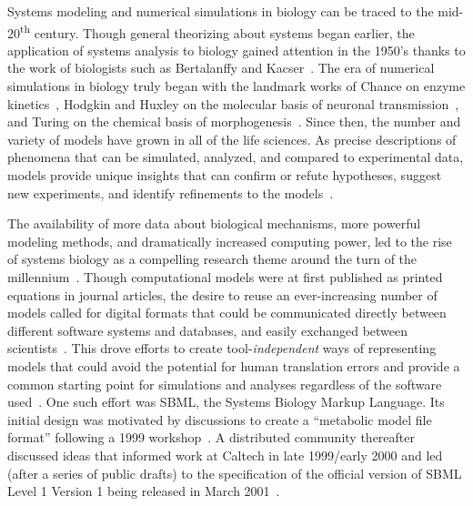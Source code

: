\documentclass{sbml-paper}
\begin{document}
Systems modeling and numerical simulations in biology can be traced to the mid-20\textsuperscript{th} century. Though general theorizing about systems began earlier, the application of systems analysis to biology gained attention in the 1950's thanks to the work of biologists such as Bertalanffy and Kacser~\citep{Von_Bertalanffy1950-dy, Von_Bertalanffy1950-wa, Kacser1957-ox}. The era of numerical simulations in biology truly began with the landmark works of Chance on enzyme kinetics~\citep{chance1952mechanism, chance1940kinetics}, Hodgkin and Huxley on the molecular basis of neuronal transmission~\citep{hodgkin1952quantitative}, and Turing on the chemical basis of morphogenesis~\citep{turing1990chemical}. Since then, the number and variety of models have grown in all of the life sciences. As precise descriptions of phenomena that can be simulated, analyzed, and compared to experimental data, models provide unique insights that can confirm or refute hypotheses, suggest new experiments, and identify refinements to the models~\citep{Heinrich1996, le_novere_2015}.

The availability of more data about biological mechanisms, more powerful modeling methods, and dramatically increased computing power, led to the rise of systems biology as a compelling research theme around the turn of the millennium~\citep{kitano2000perspectives, ideker2001new}. Though computational models were at first published as printed equations in journal articles, the desire to reuse an ever-increasing number of models called for digital formats that could be communicated directly between different software systems and databases, and easily exchanged between scientists~\citep[topics of interest as early as the 1960's; c.f.][]{Garfinkel1969construction}. This drove efforts to create tool-\emph{independent} ways of representing models that could avoid the potential for human translation errors and provide a common starting point for simulations and analyses regardless of the software used~\citep{Lloyd2004-fd, Goddard2001-ix, hucka_2001}. One such effort was SBML, the Systems Biology Markup Language. Its initial design was motivated by discussions to create a ``metabolic model file format'' following a 1999 workshop~\citep{Cornish-Bowden2000technological, kell2008the}. A distributed community thereafter discussed ideas that informed work at Caltech in late 1999/early 2000 and led (after a series of public drafts) to the specification of the official version of SBML Level 1 Version 1 being released in March 2001~\citep{hucka_2003}.
\end{document}
